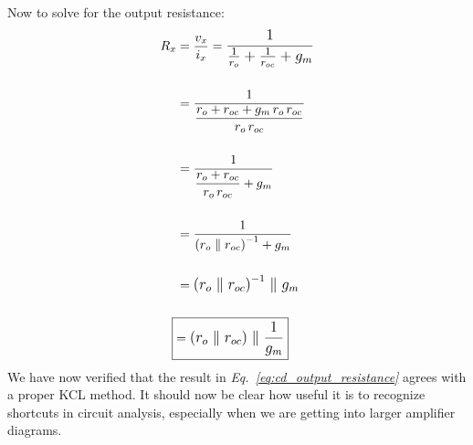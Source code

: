 Now to solve for the output resistance:
    \begin{align}
        R_x &= \frac{v_x}{i_x} = \mathlarger{\frac{1}{\frac{1}{r_o} + \frac{1}{r_{oc}} + g_m}}\\[0.5cm]
        &= \frac{1}{\mathlarger{\frac{r_o + r_{oc} + g_m\,r_o\,r_{oc}}{r_o\,r_{oc}}}}\\[0.5cm]
        &= \frac{1}{\mathlarger{\frac{r_o + r_{oc}}{r_o\,r_{oc}} + g_m}}\\[0.5cm]
        &= \frac{1}{\mathlarger{{\left(r_o \parallel r_{oc}\right)}^{-1} + g_m}}\\[0.5cm]
        &= \mathlarger{{\left(r_o \parallel r_{oc}\right)}^{-1} \parallel g_m}\\[0.5cm]
        \Aboxed{&= \mathlarger{\left(r_o \parallel r_{oc}\right) \parallel \frac{1}{g_m}}}
    \end{align}
We have now verified that the result in \emph{Eq.~\ref{eq:cd_output_resistance}} agrees with a proper KCL method.  It should now be clear how useful it is to recognize shortcuts in circuit analysis, especially when we are getting into larger amplifier diagrams.
